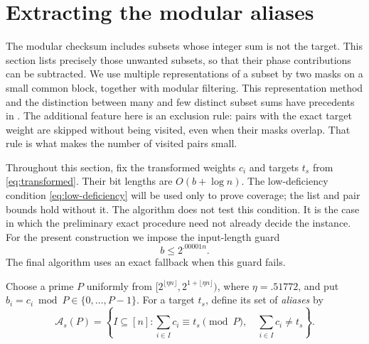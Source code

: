 \section{Extracting the modular aliases}
\label{sec:aliases}

The modular checksum includes subsets whose integer sum is not the target.
This section lists precisely those unwanted subsets, so that their phase
contributions can be subtracted.  We use multiple representations of a subset
by two masks on a small common block, together with modular filtering.  This
representation method and the distinction between many and few distinct
subset sums have precedents in
\cite{HGJ2010,AKKN2016,NederlofWegrzycki2021}.  The additional feature here is
an exclusion rule: pairs with the exact target weight are skipped without
being visited, even when their masks overlap.  That rule is what makes the
number of visited pairs small.

Throughout this section, fix the transformed weights $c_i$ and targets $t_s$
from \eqref{eq:transformed}.  Their bit lengths are $O(b+\log n)$.
The low-deficiency condition \eqref{eq:low-deficiency} will be used only
to prove coverage; the list and pair bounds hold without it.  The algorithm
does not test this condition.  It is the case in which the preliminary
exact procedure need not already decide the instance.  For the present
construction we impose the input-length guard
\begin{equation}
 b\le 2^{.00001n}.
 \label{eq:bit-guard}
\end{equation}
The final algorithm uses an exact fallback when this guard fails.

Choose a prime $P$ uniformly from
$[2^{\lfloor\eta n\rfloor},2^{1+\lfloor\eta n\rfloor})$, where
$\eta=.51772$, and put $b_i=c_i\bmod P\in\{0,\ldots,P-1\}$.
For a target $t_s$, define its set of \emph{aliases} by
\begin{equation}
 \mathcal A_s(P)=
 \left\{I\subseteq[n]:
     \sum_{i\in I}c_i\equiv t_s\pmod P,
     \quad \sum_{i\in I}c_i\ne t_s\right\}.
 \label{eq:alias-definition}
\end{equation}

